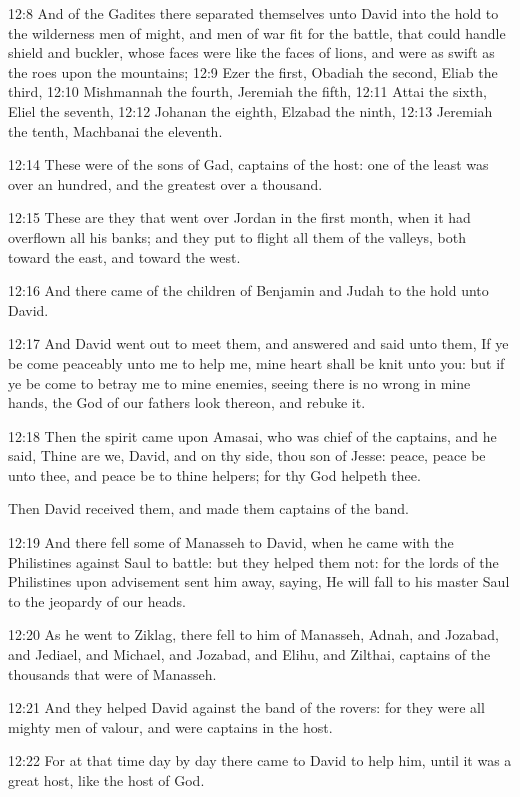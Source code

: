 12:8 And of the Gadites there separated themselves unto David into the hold to the wilderness men of might, and men of war fit for the battle, that could handle shield and buckler, whose faces were like the faces of lions, and were as swift as the roes upon the mountains; 12:9 Ezer the first, Obadiah the second, Eliab the third, 12:10 Mishmannah the fourth, Jeremiah the fifth, 12:11 Attai the sixth, Eliel the seventh, 12:12 Johanan the eighth, Elzabad the ninth, 12:13 Jeremiah the tenth, Machbanai the eleventh.

12:14 These were of the sons of Gad, captains of the host: one of the least was over an hundred, and the greatest over a thousand.

12:15 These are they that went over Jordan in the first month, when it had overflown all his banks; and they put to flight all them of the valleys, both toward the east, and toward the west.

12:16 And there came of the children of Benjamin and Judah to the hold unto David.

12:17 And David went out to meet them, and answered and said unto them, If ye be come peaceably unto me to help me, mine heart shall be knit unto you: but if ye be come to betray me to mine enemies, seeing there is no wrong in mine hands, the God of our fathers look thereon, and rebuke it.

12:18 Then the spirit came upon Amasai, who was chief of the captains, and he said, Thine are we, David, and on thy side, thou son of Jesse: peace, peace be unto thee, and peace be to thine helpers; for thy God helpeth thee.

Then David received them, and made them captains of the band.

12:19 And there fell some of Manasseh to David, when he came with the Philistines against Saul to battle: but they helped them not: for the lords of the Philistines upon advisement sent him away, saying, He will fall to his master Saul to the jeopardy of our heads.

12:20 As he went to Ziklag, there fell to him of Manasseh, Adnah, and Jozabad, and Jediael, and Michael, and Jozabad, and Elihu, and Zilthai, captains of the thousands that were of Manasseh.

12:21 And they helped David against the band of the rovers: for they were all mighty men of valour, and were captains in the host.

12:22 For at that time day by day there came to David to help him, until it was a great host, like the host of God.

